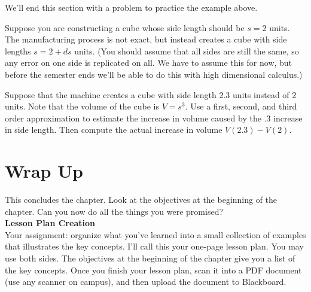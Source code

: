  We'll end this section with a problem to practice the example above.
 
 \begin{problem}
 Suppose you are constructing a cube whose side length should be $s=2$ units. The manufacturing process is not exact, but instead creates a cube with side lengths $s=2+ds$ units. (You should assume that all sides are still the same, so any error on one side is replicated on all.  We have to assume this for now, but before the semester ends we'll be able to do this with high dimensional calculus.) 
 
  Suppose that the machine creates a cube with side length $2.3$ units instead of 2 units.  Note that the volume of the cube is $V=s^3$.  Use a first, second, and third order approximation to estimate the increase in volume caused by the .3 increase in side length.  Then compute the actual increase in volume $V(2.3)-V(2)$.   
 \end{problem}

\section{Wrap Up}
This concludes the chapter.  Look at the objectives at the beginning of the chapter. Can you now do all the things you were promised? \\
\textbf{Lesson Plan Creation\\}
Your assignment: organize what you've learned into a small collection of examples that illustrates the key concepts. I'll call this your one-page lesson plan. You may use both sides. The objectives at the beginning of the chapter give you a list of the key concepts. Once you finish your lesson plan, scan it into a PDF document (use any scanner on campus), and then upload the document to Blackboard.

